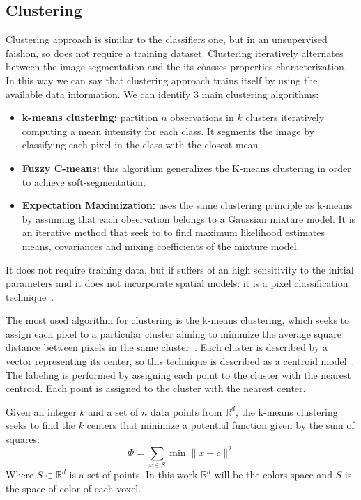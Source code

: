 \documentclass{standalone}
\begin{document}
	\subsection{Clustering}

		Clustering approach is similar to the classifiers one, but in an unsupervised faishon, so does not require a training dataset.
		Clustering iteratively alternates between the image segmentation and the its còasses properties characterization. In this way we can say that clustering approach trains itself by using the available data information.
		We can identify 3 main clustering algorithms: 
		\begin{itemize}
	
			\item \textbf{k-means clustering: } partition $n$ observations in $k$ clusters iteratively computing a mean intensity for each class. It segments the image by classifying each pixel in the class with the closest mean
	
			\item \textbf{Fuzzy C-means: } this algorithm generalizes the K-means clustering in order to achieve soft-segmentation;
		
			\item \textbf{Expectation Maximization:} uses the same clustering principle as k-means by assuming that each observation belongs to a Gaussian mixture model. It is an iterative method that seek to to find maximum likelihood estimates means, covariances and mixing coefficients of the mixture model.
		\end{itemize}

		It does not require training data, but if suffers of an high sensitivity to the initial parameters and it does not incorporate spatial models: it is a pixel classification technique~\cite{ART:Pham}. 
		
		
		The most used algorithm for clustering is the k-means clustering, which seeks to assign each pixel to a particular cluster aiming to minimize the average square distance between pixels in the same cluster~\cite{Arthur2007}. Each cluster is described by a vector representing its center, so this technique is described as a centroid model~\cite{ART:Morisette}. The labeling is performed by assigning each point to the cluster with the nearest centroid.
		Each point is assigned to the cluster with the nearest center.
		
		Given an integer $k$ and a set of $n$ data points from $\mathbb{R}^d$, the k-means clustering seeks to find the $k$ centers that minimize a potential function given by the sum of squares: 
		\begin{equation}
			\Phi = \sum_{x\in S}\min\| x - c\|^2
		\end{equation} 
		Where $S\subset \mathbb R^d$ is a set of points. In this work $\mathbb{R}^d$ will be the colors space and $S$ is the space of color of each voxel.
		
\end{document}
